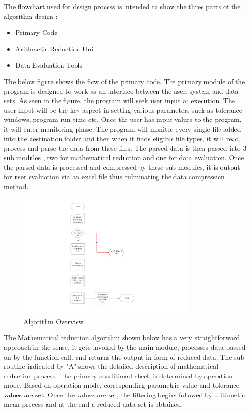 The flowchart used for design process is intended to show the three parts of the algorithm design : 

\begin{itemize}
    \item Primary Code
    \item Arithmetic Reduction Unit
    \item Data Evaluation Tools
\end{itemize}

\newpage
The below figure shows the flow of the primary code. The primary module of the program is designed to work as an interface between the user, system and data-sets. As seen in the figure, the program will seek user input at execution. The user input will be the key aspect in setting various parameters such as tolerance windows, program run time etc. Once the user has input values to the program, it will enter monitoring phase. The program will monitor every single file added into the destination folder and then when it finds eligible file types, it will read, process and parse the data from these files. The parsed data is then passed into 3 sub modules , two for mathematical reduction and one for data evaluation. Once the parsed data is processed and compressed by these sub modules, it is output for user evaluation via an excel file thus culminating the data compression method.

\begin{figure}[H]
    \centering
    \includegraphics[width= 0.8\textwidth]{images/Overview-algo.png}
    \caption [Algorithm Overview]{Algorithm Overview}  
    \label{fig:Algo-I}
\end{figure}

The Mathematical reduction algorithm shown below has a very straightforward approach in the sense, it gets invoked by the main module, processes data passed on by the function call, and returns the output in form of reduced data. The sub routine indicated by "A" shows the detailed description of mathematical reduction process. The primary conditional check is determined by operation mode. Based on operation mode, corresponding parametric value and tolerance values are set. Once the values are set, the filtering begins followed by arithmetic mean process and at the end a reduced data-set is obtained. 


